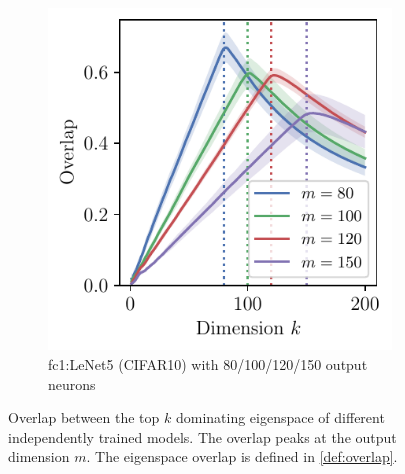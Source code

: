 \begin{figure}[H]
\begin{subfigure}[h]{0.32\columnwidth}
        \label{fig:Overlap_resnet_conv2}
    \end{subfigure}
    \begin{subfigure}[h]{0.32\columnwidth}
        \centering
        \captionsetup{justification=centering}
        \includegraphics[width=\textwidth]{Figures/SubspaceOverlap/NeurIPS/LeNetVarying.pdf}
        \vspace{-0.2in}
        \caption{fc1:LeNet5 (CIFAR10) with 80/100/120/150 output neurons}

        \label{fig:Overlap_fc1}
    \end{subfigure}

    \caption{Overlap between the top $k$ dominating eigenspace of different independently trained models. The overlap peaks at the output dimension $m$. The eigenspace overlap is defined in \cref{def:overlap}.}
    \label{fig:overlap}
    \vskip -0.1in
\end{figure}


